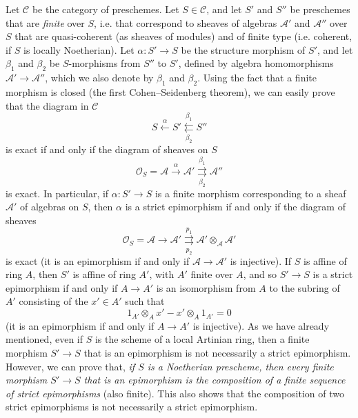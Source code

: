 \label{fga3.i-a.2.b}
\begin{example}
    Let $\mathcal{C}$ be the category of preschemes.
    Let $S\in\mathcal{C}$, and let $S'$ and $S''$ be preschemes that are \emph{finite} over $S$, i.e. that correspond to sheaves of algebras $\mathcal{A}'$ and $\mathcal{A}''$ over $S$ that are quasi-coherent (as sheaves of modules) and of finite type (i.e. coherent, if $S$ is locally Noetherian).
    Let $\alpha\colon S'\to S$ be the structure morphism of $S'$, and let $\beta_1$ and $\beta_2$ be $S$-morphisms from $S''$ to $S'$, defined by algebra homomorphisms $\mathcal{A}'\to\mathcal{A}''$, which we also denote by $\beta_1$ and $\beta_2$.
    Using the fact that a finite morphism is closed (the first Cohen–Seidenberg theorem), we can easily prove that the diagram in $\mathcal{C}$
    \begin{equation}\tag{+}\label{fga3.i-a.2.b-equation}
        S \xleftarrow{\alpha}
        S' \overset{\beta_1}{\underset{\beta_2}{\leftleftarrows}}
        S''
    \end{equation}
    is exact if and only if the diagram of sheaves on $S$
    \[
        \mathcal{O}_S = \mathcal{A} \xrightarrow{\alpha}
        \mathcal{A}' \overset{\beta_1}{\underset{\beta_2}{\rightrightarrows}}
        \mathcal{A}''
    \]
    is exact.
    In particular, if $\alpha\colon S'\to S$ is a finite morphism corresponding to a sheaf $\mathcal{A}'$ of algebras on $S$, then $\alpha$ is a strict epimorphism if and only if the diagram of sheaves
    \[
        \mathcal{O}_S = \mathcal{A} \to
        \mathcal{A}' \overset{p_1}{\underset{p_2}{\rightrightarrows}}
        \mathcal{A}'\otimes_{\mathcal{A}}\mathcal{A}'
    \]
    is exact (it is an epimorphism if and only if $\mathcal{A}\to\mathcal{A}'$ is injective).
    If $S$ is affine of ring $A$, then $S'$ is affine of ring $A'$, with $A'$ finite over $A$, and so $S'\to S$ is a strict epimorphism if and only if $A\to A'$ is an isomorphism from $A$ to the subring of $A'$ consisting of the $x'\in A'$ such that
    \[
        1_{A'}\otimes_A x' - x'\otimes_A 1_{A'} = 0
    \]
    (it is an epimorphism if and only if $A\to A'$ is injective).
    As we have already mentioned, even if $S$ is the scheme of a local Artinian ring, then a finite morphism $S'\to S$ that is an epimorphism is not necessarily a strict epimorphism.
    However, we can prove that, \emph{if $S$ is a Noetherian prescheme, then every finite morphism $S'\to S$ that is an epimorphism is the composition of a finite sequence of strict epimorphisms} (also finite).
    This also shows that the composition of two strict epimorphisms is not necessarily a strict epimorphism.
\end{example}

